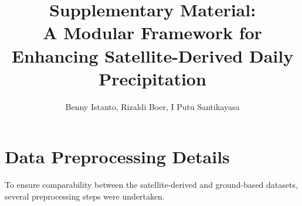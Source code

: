 \documentclass[11pt,a4paper]{article}
\title{\Large Supplementary Material:\\[6pt]
A Modular Framework for Enhancing Satellite-Derived Daily Precipitation}
\author{Benny Istanto, Rizaldi Boer, I Putu Santikayasa}
\date{}
\begin{document}
\linenumbers
\maketitle

\setcounter{section}{0}
\renewcommand{\thesection}{S\arabic{section}}
\renewcommand{\thesubsection}{S\arabic{section}.\arabic{subsection}}
\renewcommand{\theequation}{S\arabic{equation}}
\renewcommand{\thetable}{S\arabic{table}}
\renewcommand{\thefigure}{S\arabic{figure}}

\section{Data Preprocessing Details}\label{sec:s1}

To ensure comparability between the satellite-derived and ground-based datasets, several preprocessing steps were undertaken.
\end{document}

